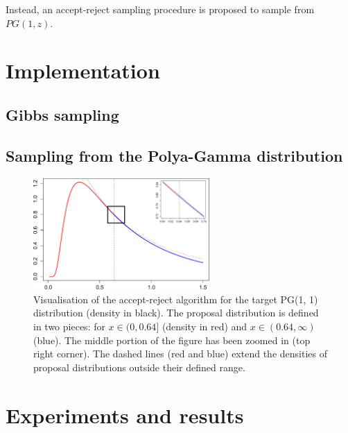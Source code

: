 \documentclass[a4paper]{article}\usepackage[]{graphicx}\usepackage[]{color}
\begin{document}
Instead, an accept-reject sampling procedure is proposed to sample from $PG(1,z)$.

\section{Implementation}

\subsection{Gibbs sampling}

\subsection{Sampling from the Polya-Gamma distribution}

\begin{figure}
\centering
\includegraphics[width=0.6\textwidth]{fig/fig_accept_reject_final}
\caption{Visualisation of the accept-reject algorithm for the target PG(1, 1) distribution (density in black). The proposal distribution is defined in two pieces: for $x \in (0, 0.64]$ (density in red) and $x \in (0.64, \infty)$ (blue). The middle portion of the figure has been zoomed in (top right corner). The dashed lines (red and blue) extend the densities of proposal distributions outside their defined range.}
\end{figure}


\section{Experiments and results}
\end{document}
